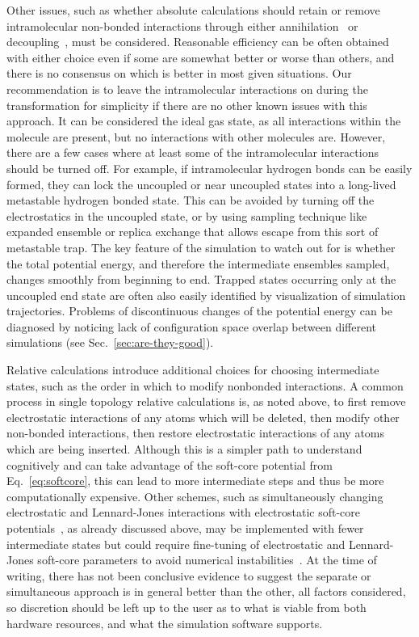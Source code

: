 \documentclass[9pt,bestpractices]{livecoms}
\begin{document}
Other issues, such as whether absolute calculations should retain or remove intramolecular non-bonded interactions
through either annihilation~\cite{hermans1997inclusion, mann2000modeling, boresch2003absolute, wang2006absolute, mobley2006use} or decoupling~\cite{fujitani2005direct, mobley2006use}, must be considered. Reasonable efficiency can be often obtained with either choice even if some are somewhat better or worse than others, and there is no consensus on which is better in most given situations. Our recommendation is to leave the intramolecular interactions on during the transformation for simplicity if there are no other known issues with this approach.  It can be considered the ideal gas state, as all interactions within the molecule are present, but no interactions with other molecules are.  However, there are a few cases where at least some of the intramolecular interactions should be turned off.  For example, if intramolecular hydrogen bonds can be easily formed, they can lock the uncoupled or near uncoupled states into a long-lived metastable hydrogen bonded state.  This can be avoided by turning off the electrostatics in the uncoupled state, or by using sampling technique like expanded ensemble or replica exchange that allows escape from this sort of metastable trap.  The key feature of the simulation to watch out for is whether the total potential energy, and therefore the intermediate ensembles sampled, changes smoothly from beginning to end.  Trapped states occurring only at the uncoupled end state are often also easily identified by visualization of simulation trajectories. Problems of discontinuous changes of the potential energy can be diagnosed by noticing lack of configuration space overlap between different simulations (see Sec.~\ref{sec:are-they-good}).


Relative calculations introduce additional choices for choosing intermediate states, such as the order in which to modify nonbonded interactions.
A common process in single topology relative calculations is, as noted above, to first remove electrostatic interactions of any atoms which will be deleted, then modify other non-bonded interactions, then restore electrostatic interactions of any atoms which are being inserted. Although this is a simpler path to understand cognitively and can take advantage of the soft-core potential from Eq.~\ref{eq:softcore}, this can lead to more intermediate steps and thus be more computationally expensive.
Other schemes, such as simultaneously changing electrostatic and Lennard-Jones interactions with electrostatic soft-core potentials~\cite{steinbrecher2007nonlinear}, as already discussed above, may be implemented with fewer intermediate states but could require fine-tuning of electrostatic and Lennard-Jones soft-core parameters to avoid numerical instabilities~\cite{tsai2023amber}. 
At the time of writing, there has not been conclusive evidence to suggest the separate or simultaneous approach is in general better than the other, all factors considered, so discretion should be left up to the user as to what is viable from both hardware resources, and what the simulation software supports.
\end{document}
